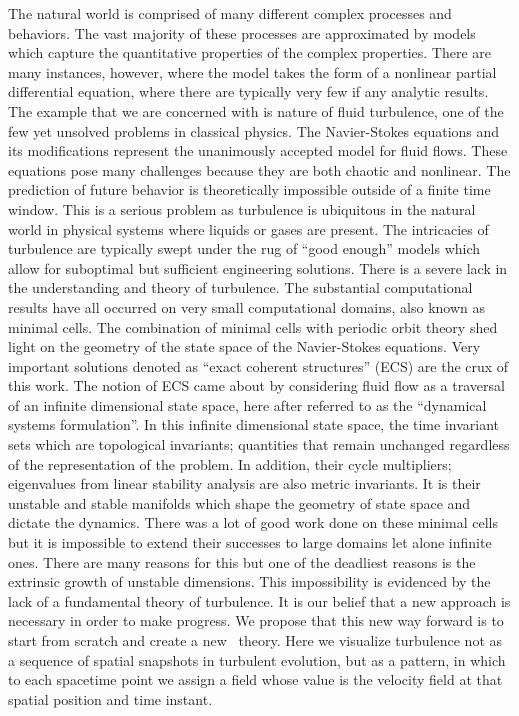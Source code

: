 The natural world is comprised of many different complex
processes and behaviors. The vast majority of these processes
are approximated by models which capture the quantitative
properties of the complex properties.
There are many instances, however, where
the model takes the form of a nonlinear partial differential
equation, where there are typically very few if any
analytic results. The example that we are concerned with
is nature of fluid turbulence,
one of the few yet unsolved problems in classical physics.
The Navier-Stokes equations and its modifications represent
the unanimously accepted model for fluid flows.
These equations pose many challenges because they are both
chaotic and nonlinear. The prediction of future behavior
is theoretically impossible outside of a finite time window.
This is a serious problem as turbulence
is ubiquitous in the natural world in physical systems where
liquids or gases are present. The intricacies of turbulence
are typically swept under the rug of ``good enough'' models
which allow for suboptimal but sufficient engineering solutions.
There is a severe lack in the understanding and theory of turbulence.
The substantial computational results have all occurred on
very small computational domains, also known as minimal cells. %
The combination of minimal cells with periodic orbit theory
shed light on the geometry of the state space of the Navier-Stokes
equations. Very important solutions denoted as ``exact coherent structures'' (ECS)
are the crux of this work.
The notion of ECS came about by considering fluid flow
as a traversal of an infinite dimensional state space, here after referred
to as the ``dynamical systems formulation''.
In this infinite dimensional state space, the time invariant sets
which are topological invariants; quantities that remain
unchanged regardless of the representation of the problem. In addition,
their cycle multipliers; eigenvalues from linear stability
analysis are also metric invariants.
It is their unstable and stable manifolds which shape the geometry of
state space and dictate the dynamics.
There was a lot of good work done on these minimal cells but
it is impossible to extend their successes to large
domains let alone infinite ones. There are many reasons
for this but one of the deadliest reasons is the
extrinsic growth of unstable dimensions. This impossibility
is evidenced by the lack of a fundamental theory of turbulence.
It is our belief that a new approach is necessary in order
to make progress. We propose that this new way forward is
to start from scratch and create a new \spt\ theory.
Here we visualize
turbulence not as a sequence of
spatial snapshots in turbulent evolution,
but as a {\spt} pattern, in which to each
spacetime point we assign a field whose value is the velocity field
at that spatial position and time instant.

